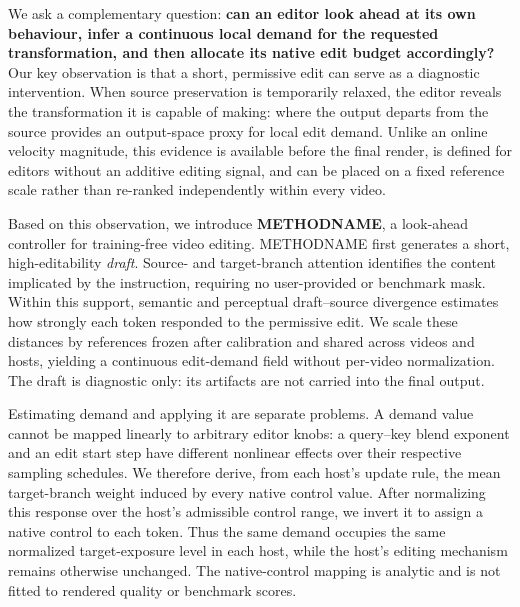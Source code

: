 We ask a complementary question: \textbf{can an editor look ahead at its own
behaviour, infer a continuous local demand for the requested transformation, and
then allocate its native edit budget accordingly?} Our key observation is that
a short, permissive edit can serve as a diagnostic intervention. When source
preservation is temporarily relaxed, the editor reveals the transformation it
is capable of making: where the output departs from the source provides an
output-space proxy for local edit demand. Unlike an online velocity magnitude,
this evidence is available before the final render, is defined for editors
without an additive editing signal, and can be placed on a fixed reference
scale rather than re-ranked independently within every video.

Based on this observation, we introduce \textbf{METHODNAME}, a look-ahead
controller for training-free video editing. METHODNAME first generates a short,
high-editability \emph{draft}. Source- and target-branch attention identifies
the content implicated by the instruction, requiring no user-provided or
benchmark mask. Within this support, semantic and perceptual draft--source
divergence estimates how strongly each token responded to the permissive edit.
We scale these distances by references frozen after calibration and shared
across videos and hosts, yielding a continuous edit-demand field without
per-video normalization. The draft is diagnostic only: its artifacts are not
carried into the final output.

Estimating demand and applying it are separate problems. A demand value cannot
be mapped linearly to arbitrary editor knobs: a query--key blend exponent and
an edit start step have different nonlinear effects over their respective
sampling schedules. We therefore derive, from each host's update rule, the mean
target-branch weight induced by every native control value. After normalizing
this response over the host's admissible control range, we invert it to assign a
native control to each token. Thus the same demand occupies the same normalized
target-exposure level in each host, while the host's editing mechanism remains
otherwise unchanged. The native-control mapping is analytic and is not fitted
to rendered quality or benchmark scores.

